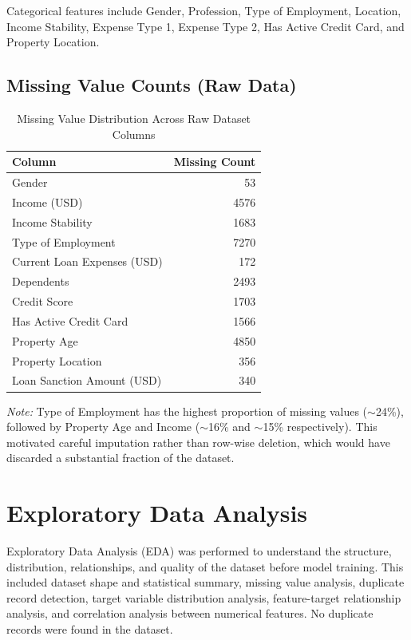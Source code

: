 \documentclass[12pt,a4paper]{article}
\begin{document}
Categorical features include Gender, Profession, Type of Employment, Location, Income Stability, Expense Type 1, Expense Type 2, Has Active Credit Card, and Property Location.

\subsection*{Missing Value Counts (Raw Data)}

\begin{table}[H]
\centering
\begin{tabular}{lr}
\toprule
Column & Missing Count \\
\midrule
Gender & 53 \\
Income (USD) & 4576 \\
Income Stability & 1683 \\
Type of Employment & 7270 \\
Current Loan Expenses (USD) & 172 \\
Dependents & 2493 \\
Credit Score & 1703 \\
Has Active Credit Card & 1566 \\
Property Age & 4850 \\
Property Location & 356 \\
Loan Sanction Amount (USD) & 340 \\
\bottomrule
\end{tabular}
\caption{Missing Value Distribution Across Raw Dataset Columns}
\end{table}

\textit{Note:} Type of Employment has the highest proportion of missing values ($\sim$24\%), followed by Property Age and Income ($\sim$16\% and $\sim$15\% respectively). This motivated careful imputation rather than row-wise deletion, which would have discarded a substantial fraction of the dataset.

\section{Exploratory Data Analysis}

Exploratory Data Analysis (EDA) was performed to understand the structure, distribution, relationships, and quality of the dataset before model training. This included dataset shape and statistical summary, missing value analysis, duplicate record detection, target variable distribution analysis, feature-target relationship analysis, and correlation analysis between numerical features. No duplicate records were found in the dataset.
\end{document}
